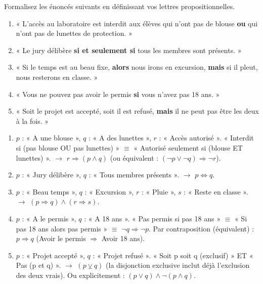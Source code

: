 \documentclass[11pt]{article}
\begin{document}
\begin{exercice}
Formalisez les énoncés suivants en définissant vos lettres propositionnelles.
\begin{enumerate}
    \item « L'accès au laboratoire est interdit aux élèves qui n'ont pas de blouse \textbf{ou} qui n'ont pas de lunettes de protection. »
    \item « Le jury délibère \textbf{si et seulement si} tous les membres sont présents. »
    \item « Si le temps est au beau fixe, \textbf{alors} nous irons en excursion, \textbf{mais} si il pleut, nous resterons en classe. »
    \item « Vous ne pouvez pas avoir le permis \textbf{si} vous n'avez pas 18 ans. »
    \item « Soit le projet est accepté, soit il est refusé, \textbf{mais} il ne peut pas être les deux à la fois. »
\end{enumerate}
\end{exercice}

\begin{corrige}
\begin{enumerate}
    \item $p$ : « A une blouse », $q$ : « A des lunettes », $r$ : « Accès autorisé ».
        « Interdit si (pas blouse OU pas lunettes) » $\equiv$ « Autorisé seulement si (blouse ET lunettes) ».
        $\rightarrow$ $r \Rightarrow (p \land q)$  (ou équivalent : $(\neg p \lor \neg q) \Rightarrow \neg r$).
    \item $p$ : « Jury délibère », $q$ : « Tous membres présents ».
        $\rightarrow$ $p \Leftrightarrow q$.
    \item $p$ : « Beau temps », $q$ : « Excursion », $r$ : « Pluie », $s$ : « Reste en classe ».
        $\rightarrow$ $(p \Rightarrow q) \land (r \Rightarrow s)$.
    \item $p$ : « A le permis », $q$ : « A 18 ans ».
        « Pas permis si pas 18 ans » $\equiv$ « Si pas 18 ans alors pas permis » $\equiv$ $\neg q \Rightarrow \neg p$.
        Par contraposition (équivalent) : $p \Rightarrow q$ (Avoir le permis $\Rightarrow$ Avoir 18 ans).
    \item $p$ : « Projet accepté », $q$ : « Projet refusé ».
        « Soit p soit q (exclusif) » ET « Pas (p et q) ».
        $\rightarrow$ $(p \veebar q)$  (la disjonction exclusive inclut déjà l'exclusion des deux vrais).
        Ou explicitement : $(p \lor q) \land \neg(p \land q)$.
\end{enumerate}
\end{corrige}
\end{document}
